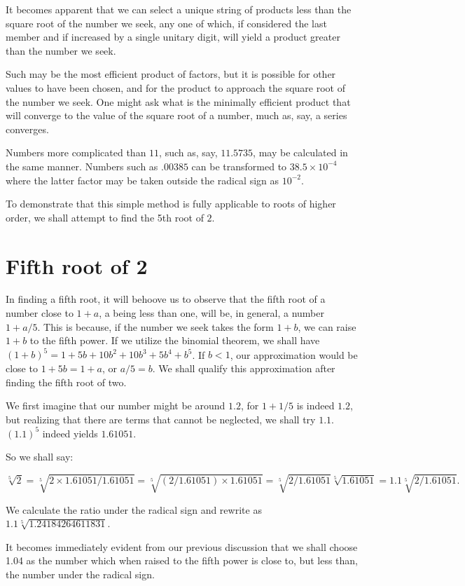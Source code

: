 \documentclass[12pt]{article}
\begin{document}
It becomes apparent that we can select a unique string of products less than the square root of the number we seek, any one of which, if considered the last member and if increased by a single unitary digit, will yield a product greater than the number we seek.

Such may be the most efficient product of factors, but it is possible for other values to have been chosen, and for the product to approach the square root of the number we seek. One might ask what is the minimally efficient product that will converge to the value of the square root of a number, much as, say, a series converges.

Numbers more complicated than $11$, such as, say, $11.5735$, may be calculated in the same manner. Numbers such as $.00385$ can be transformed to $38.5 \times 10^{-4}$ where the latter factor may be taken outside the radical sign as $10^{-2}$.

To demonstrate that this simple method is fully applicable to roots of higher order, we shall attempt to find the 5th root of $2$.

\section*{Fifth root of 2}

In finding a fifth root, it will behoove us to observe that the fifth
root of a number close to $1 + a$, a being less than one, will be, in
general, a number $1 + a/5$. This is because, if the number we seek
takes the form $1+ b$, we can raise $1 + b$ to the fifth power. If we
utilize the binomial theorem, we shall have 
$(1 + b)^5 = 1 + 5b + 10b^2 + 10b^3 + 5b^4 + b^5$. If $b < 1$, our approximation would be
close to $1 + 5b = 1 + a$, or $a/5 = b$. We shall qualify this
approximation after finding the fifth root of two.

We first imagine that our number might be around $1.2$, for $1 + 1/5$ is indeed $1.2$, but realizing that there are terms that cannot be neglected, we shall try $1.1$.  $(1.1)^5$ indeed yields $1.61051$.

So we shall say:

$$\sqrt[5]{2} =  \sqrt[5]{2 \times 1.61051/1.61051} =  \sqrt[5]{(2/1.61051) \times 1.61051} =  \sqrt[5]{2/1.61051}\sqrt[5]{1.61051} = 1.1  \sqrt[5]{2/1.61051}.$$

We calculate the ratio under the radical sign and rewrite as $1.1  \sqrt[5]{1.24184264611831}$.

It becomes immediately evident from our previous discussion that we shall choose 1.04 as the number which when raised to the fifth power is close to, but less than, the number under the radical sign.  
\end{document}
